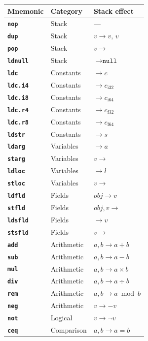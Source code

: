 \documentclass[11pt,a4paper]{article}
\newcommand{\opcode}[1]{\textbf{\texttt{#1}}}
\begin{document}
\begin{longtable}{lll}
  \toprule
  \textbf{Mnemonic} & \textbf{Category} & \textbf{Stack effect} \\
  \midrule
  \endhead
  \opcode{nop}       & Stack      & --- \\
  \opcode{dup}       & Stack      & $v \to v,\, v$ \\
  \opcode{pop}       & Stack      & $v \to$ \\
  \opcode{ldnull}    & Stack      & $\to \texttt{null}$ \\
  \opcode{ldc}       & Constants  & $\to c$ \\
  \opcode{ldc.i4}    & Constants  & $\to c_{\text{i32}}$ \\
  \opcode{ldc.i8}    & Constants  & $\to c_{\text{i64}}$ \\
  \opcode{ldc.r4}    & Constants  & $\to c_{\text{f32}}$ \\
  \opcode{ldc.r8}    & Constants  & $\to c_{\text{f64}}$ \\
  \opcode{ldstr}     & Constants  & $\to s$ \\
  \opcode{ldarg}     & Variables  & $\to a$ \\
  \opcode{starg}     & Variables  & $v \to$ \\
  \opcode{ldloc}     & Variables  & $\to l$ \\
  \opcode{stloc}     & Variables  & $v \to$ \\
  \opcode{ldfld}     & Fields     & $\mathit{obj} \to v$ \\
  \opcode{stfld}     & Fields     & $\mathit{obj}, v \to$ \\
  \opcode{ldsfld}    & Fields     & $\to v$ \\
  \opcode{stsfld}    & Fields     & $v \to$ \\
  \opcode{add}       & Arithmetic & $a, b \to a{+}b$ \\
  \opcode{sub}       & Arithmetic & $a, b \to a{-}b$ \\
  \opcode{mul}       & Arithmetic & $a, b \to a{\times}b$ \\
  \opcode{div}       & Arithmetic & $a, b \to a{\div}b$ \\
  \opcode{rem}       & Arithmetic & $a, b \to a \bmod b$ \\
  \opcode{neg}       & Arithmetic & $v \to {-}v$ \\
  \opcode{not}       & Logical    & $v \to \neg v$ \\
  \opcode{ceq}       & Comparison & $a, b \to a{=}b$ \\

\end{longtable}
\end{document}
